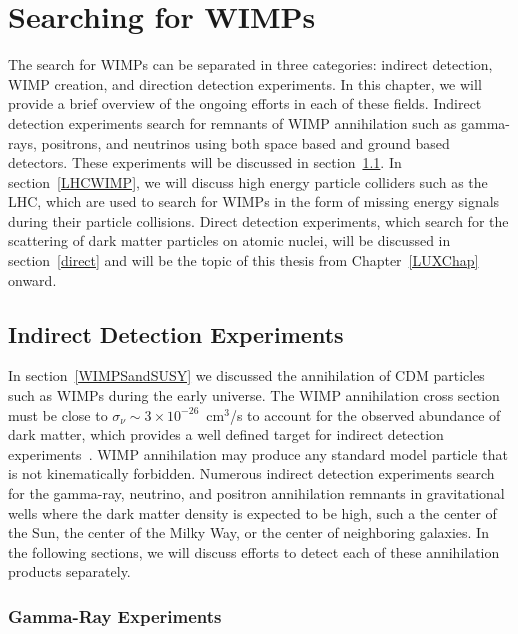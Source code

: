 \section{Searching for WIMPs} \label{Chapter2}

The search for WIMPs can be separated in three categories: indirect detection, WIMP creation, and direction detection experiments.  In this chapter, we will provide a brief overview of the ongoing efforts in each of these fields. Indirect detection experiments search for remnants of WIMP annihilation such as gamma-rays, positrons, and neutrinos using both space based and ground based detectors.  These experiments will be discussed in section~\ref{indi}. In section~\ref{LHCWIMP}, we will discuss high energy particle colliders such as the LHC, which are used to search for WIMPs in the form of missing energy signals during their particle collisions.   Direct detection experiments, which search for the scattering of dark matter particles on atomic nuclei, will be discussed in section~\ref{direct} and will be the topic of this thesis from Chapter~\ref{LUXChap} onward. 

\subsection{Indirect Detection Experiments}\label{indi}

In section~\ref{WIMPSandSUSY} we discussed the annihilation of CDM particles such as WIMPs during the early universe.  The WIMP annihilation cross section must be close to $\sigma_\nu \sim 3\times 10^{-26}$~cm$^3$/s to account for the observed abundance of dark matter, which provides a well defined target for indirect detection experiments~\cite{DMCross}.  WIMP annihilation may produce any standard model particle that is not kinematically forbidden. Numerous indirect detection experiments search for the gamma-ray, neutrino, and positron annihilation remnants in gravitational wells where the dark matter density is expected to be high, such a the center of the Sun, the center of the Milky Way, or the center of neighboring galaxies.   In the following sections, we will discuss efforts to detect each of these annihilation products separately.

\subsubsection{Gamma-Ray Experiments}

